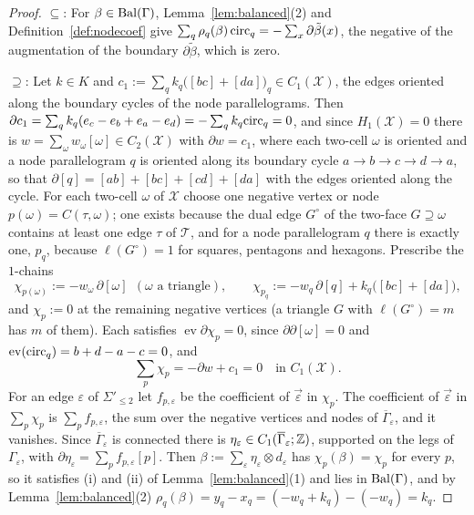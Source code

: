 \begin{proof}
$\subseteq$: For $\beta\in\mathrm{Bal}(\Gamma)$, Lemma~\ref{lem:balanced}(2) and Definition~\ref{def:nodecoef} give
$\sum_q\rho_q(\beta)\,\mathrm{circ}_q=-\sum_{x}\partial\tilde\beta(x)$, the negative of the augmentation of the boundary
$\partial\tilde\beta$, which is zero.

$\supseteq$: Let $k\in K$ and $c_1:=\sum_qk_q\bigl([bc]+[da]\bigr)_q\in C_1(\mathcal X)$, the edges oriented along the
boundary cycles of the node parallelograms. Then $\partial c_1=\sum_qk_q(e_c-e_b+e_a-e_d)=-\sum_qk_q\mathrm{circ}_q=0$, and
since $H_1(\mathcal X)=0$ there is $w=\sum_\omega w_\omega[\omega]\in C_2(\mathcal X)$ with $\partial w=c_1$, where each
two-cell $\omega$ is oriented and a node parallelogram $q$ is oriented along its boundary cycle $a\to b\to c\to d\to a$, so
that $\partial[q]=[ab]+[bc]+[cd]+[da]$ with the edges oriented along the cycle. For each two-cell $\omega$ of $\mathcal X$ choose one negative vertex or node $p(\omega)=C(\tau,\omega)$;
one exists because the dual edge $G^\circ$ of the two-face $G\supseteq\omega$ contains at least one edge $\tau$ of
$\mathcal T$, and for a node parallelogram $q$ there is exactly one, $p_q$, because $\ell(G^\circ)=1$ for squares,
pentagons and hexagons. Prescribe the $1$-chains
\[
\chi_{p(\omega)}:=-w_\omega\,\partial[\omega]\ \ (\omega\text{ a triangle}),\qquad
\chi_{p_q}:=-w_q\,\partial[q]+k_q\bigl([bc]+[da]\bigr),
\]
and $\chi_p:=0$ at the remaining negative vertices (a triangle $G$ with $\ell(G^\circ)=m$ has $m$ of them). Each
satisfies $\operatorname{ev}\partial\chi_p=0$, since $\partial\partial[\omega]=0$ and $\operatorname{ev}(\mathrm{circ}_q)=b+d-a-c=0$, and
\[
\sum_p\chi_p=-\partial w+c_1=0\quad\text{in }C_1(\mathcal X).
\]
For an edge $\varepsilon$ of $\Sigma'_{\le2}$ let $f_{p,\varepsilon}$ be the coefficient of $\vec\varepsilon$ in $\chi_p$. The
coefficient of $\vec\varepsilon$ in $\sum_p\chi_p$ is $\sum_pf_{p,\varepsilon}$, the sum over the negative vertices and
nodes of $\overline\Gamma_\varepsilon$, and it vanishes. Since $\overline\Gamma_\varepsilon$ is connected there is
$\eta_\varepsilon\in C_1(\overline\Gamma_\varepsilon;\mathbb Z)$, supported on the legs of $\Gamma_\varepsilon$, with
$\partial\eta_\varepsilon=\sum_pf_{p,\varepsilon}[p]$. Then $\beta:=\sum_\varepsilon\eta_\varepsilon\otimes d_\varepsilon$ has
$\chi_p(\beta)=\chi_p$ for every $p$, so it satisfies (i) and (ii) of Lemma~\ref{lem:balanced}(1) and lies in $\mathrm{Bal}(\Gamma)$, and by
Lemma~\ref{lem:balanced}(2) $\rho_q(\beta)=y_q-x_q=(-w_q+k_q)-(-w_q)=k_q$.
\end{proof}


